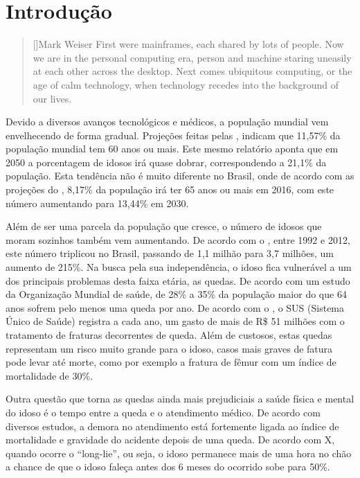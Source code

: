 \chapter{Introdução}
\label{cap:introducao}

\begin{quotation}[]{Mark Weiser}
First were mainframes, each shared by lots of people. Now we are in the personal computing era, person and machine staring uneasily at each other across the desktop. Next comes ubiquitous computing, or the age of calm technology, when technology recedes into the background of our lives. 






\end{quotation}

Devido a diversos avanços tecnológicos e médicos, a população mundial vem envelhecendo de forma gradual. Projeções feitas pelas \cite{unPopulation:13}, indicam que 11,57\% da população mundial tem 60 anos ou mais. Este mesmo relatório aponta que em 2050 a porcentagem de idosos irá quase dobrar, correspondendo a 21,1\% da população. Esta tendência não é muito diferente no Brasil, onde de acordo com as projeções do \cite{ibgePopulation:16}, 8,17\% da população irá ter 65 anos ou mais em 2016, com este número aumentando para 13,44\% em 2030.

Além de ser uma parcela da população que cresce, o número de idosos que moram sozinhos também vem aumentando. De acordo com o \cite{PNAD:12}, entre 1992 e 2012,  este número triplicou no Brasil, passando de 1,1 milhão para 3,7 milhões, um aumento de 215\%. Na busca pela sua independência, o idoso fica vulnerável a um dos principais problemas desta faixa etária, as quedas. De acordo com um estudo da Organização Mundial de saúde,  de 28\% a 35\% da população maior do que 64 anos sofrem pelo menos uma queda por ano. De acordo com o \cite{portalBrasilQuedas:12}, o SUS (Sistema Único de Saúde) registra a cada ano, um gasto de mais de R\$ 51 milhões com o tratamento de fraturas decorrentes de queda. Além de custosos, estas quedas representam um risco muito grande para o idoso, casos mais graves de fatura pode levar até morte, como por exemplo a fratura de fêmur com um índice de mortalidade de 30\%.

Outra questão que torna as quedas ainda mais prejudiciais a saúde física e mental do idoso é o tempo entre a queda e o  atendimento médico. De acordo com diversos estudos, a demora no atendimento está fortemente ligada ao índice de mortalidade e gravidade do acidente depois de uma queda. De acordo com X, quando ocorre o “long-lie”, ou seja, o idoso permanece mais de uma hora no chão a chance de que o idoso faleça antes dos 6 meses do ocorrido sobe para 50\%.

